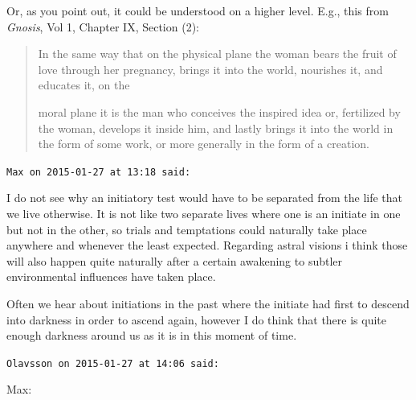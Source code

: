 \begin{footnotesize}
\begin{sffamily}
Or, as you point out, it could be understood on a higher level. E.g., this from \textit{Gnosis}, Vol 1, Chapter IX, Section (2):

\begin{quote}\footnotesize
In the same way that on the physical plane the woman bears the fruit of love through her pregnancy, brings it into the world, nourishes it, and educates it, on the

moral plane it is the man who conceives the inspired idea or, fertilized by the woman, develops it inside him, and lastly brings it into the world in the form of some work, or more generally in the form of a creation.
\end{quote}


\hfill

\texttt{Max on 2015-01-27 at 13:18 said:}

I do not see why an initiatory test would have to be separated from the life that we live otherwise. It is not like two separate lives where one is an initiate in one but not in the other, so trials and temptations could naturally take place anywhere and whenever the least expected. Regarding astral visions i think those will also happen quite naturally after a certain awakening to subtler environmental influences have taken place.

Often we hear about initiations in the past where the initiate had first to descend into darkness in order to ascend again, however I do think that there is quite enough darkness around us as it is in this moment of time.

\hfill

\texttt{Olavsson on 2015-01-27 at 14:06 said:}

Max:


\end{sffamily}
\end{footnotesize}
